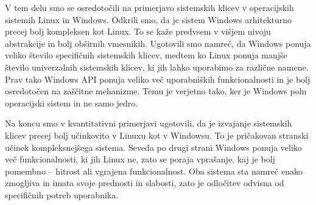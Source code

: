 \documentclass[a4paper,12pt,openright]{book}
\begin{document}
V tem delu smo se osredotočili na primerjavo sistemskih klicev v operacijskih sistemih Linux in Windows.
Odkrili smo, da je sistem Windows arhitekturno precej bolj kompleksen kot Linux.
To se kaže predvsem v višjem nivoju abstrakcije in bolj obširnih vmesnikih.
Ugotovili smo namreč, da Windows ponuja veliko število specifičnih sistemskih klicev, medtem ko Linux ponuja manjše število univerzalnih sistemskih klicev, ki jih lahko uporabimo za različne namene.
Prav tako Windows API ponuja veliko več uporabniških funkcionalnosti in je bolj osredotočen na zaščitne mehanizme.
Temu je verjetno tako, ker je Windows poln operacijski sistem in ne samo jedro.

Na koncu smo v kvantitativni primerjavi ugotovili, da je izvajanje sistemskih klicev precej bolj učinkovito v Linuxu kot v Windowsu.
To je pričakovan stranski učinek kompleksnejšega sistema.
Seveda po drugi strani Windows ponuja veliko več funkcionalnosti, ki jih Linux ne, zato se poraja vprašanje, kaj je bolj pomembno -- hitrost ali vgrajena funkcionalnost.
Oba sistema sta namreč enako zmogljiva in imata svoje prednosti in slabosti, zato je odločitev odvisna od specifičnih potreb uporabnika.


\printbibliography[heading=bibintoc,title={Literatura}]
\end{document}
